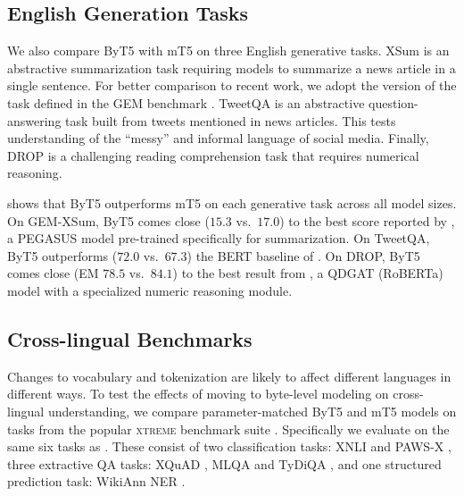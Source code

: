 \documentclass[11pt,a4paper]{article}
\begin{document}
\subsection{English Generation Tasks}

We also compare ByT5 with mT5 on three English generative tasks. XSum \cite{narayan-etal-2018-dont} is an abstractive summarization task requiring models to summarize a news article in a single sentence. For better comparison to recent work, we adopt the version of the task defined in the GEM benchmark \cite{gehrmann2021gem}. TweetQA \cite{xiong-etal-2019-tweetqa} is an abstractive question-answering task built from tweets mentioned in news articles. This tests understanding of the ``messy'' and informal language of social media. Finally, DROP \cite{dua-etal-2019-drop} is a challenging reading comprehension task that requires numerical reasoning.



 shows that ByT5 outperforms mT5 on each generative task across all model sizes. On \mbox{GEM-XSum}, ByT5 comes close ($15.3$ vs.~$17.0$) to the best score reported by \citet{gehrmann2021gem}, a PEGASUS model \cite{zhang-2020-pegasus} pre-trained specifically for summarization. On TweetQA, ByT5 outperforms ($72.0$ vs.~$67.3$) the BERT baseline of \citet{xiong-etal-2019-tweetqa}. On DROP, ByT5 comes close (EM $78.5$ vs.~$84.1$) to the best result from \citet{chen2020question}, a QDGAT (RoBERTa) model with a specialized numeric reasoning module.

\subsection{Cross-lingual Benchmarks}



Changes to vocabulary and tokenization are likely to affect different languages in different ways. To test the effects of moving to byte-level modeling on cross-lingual understanding, we compare parameter-matched ByT5 and mT5 models on tasks from the popular \textsc{xtreme} benchmark suite \cite{hu_2020_xtreme}. Specifically we evaluate on the same six tasks as \citet{mt5}. These consist of two classification tasks: XNLI \cite{conneau2018xnli} and \mbox{PAWS-X} \cite{yang-etal-2019-paws}, three extractive QA tasks: XQuAD \cite{artetxe-etal-2020-cross}, MLQA \cite{lewis-etal-2020-mlqa} and TyDiQA \cite{clark-etal-2020-tydi}, and one structured prediction task: WikiAnn NER \cite{pan-etal-2017-cross}.
\end{document}

